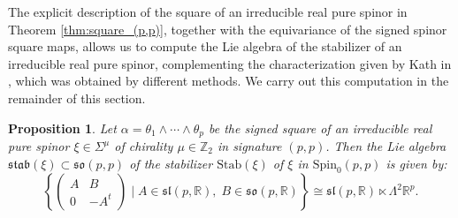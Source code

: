 \documentclass[10pt,reqno]{amsart}
\newtheorem{proposition}[theorem]{Proposition}
\theoremstyle{definition}
\theoremstyle{remark}
\newcommand{\Z}{\mathbb{Z}}
\newcommand{\R}{\mathbb{R}}
\begin{document}
The explicit description of the square of an irreducible real pure spinor in Theorem \ref{thm:square_(p,p)}, together with the equivariance of the signed spinor square maps, allows us to compute the Lie algebra of the stabilizer of an irreducible real pure spinor, complementing the characterization given by Kath in \cite[Cor.\ 5.1]{Kath_2000}, which was obtained by different methods. We carry out this computation in the remainder of this section.

\begin{proposition}
    Let $\alpha=\theta_1\wedge\cdots\wedge\theta_p$ be the signed square of an irreducible real pure spinor $\xi\in\Sigma^\mu$ of chirality $\mu\in\Z_2$ in signature $(p,p)$. Then the Lie algebra $\mathfrak{stab}(\xi)\subset\mathfrak{so}(p,p)$ of the stabilizer $\mathrm{Stab}(\xi)$ of $\xi$ in $\mathrm{Spin}_0(p,p)$ is given by: $$\left\{\begin{pmatrix}
        A&B\\
        0&-A^t
    \end{pmatrix}\mid A\in\mathfrak{sl}(p,\R),\;B\in\mathfrak{so}(p,\R)\right\}\cong\mathfrak{sl}(p,\R)\ltimes\Lambda^2\R^p.$$
\end{proposition}
\end{document}

